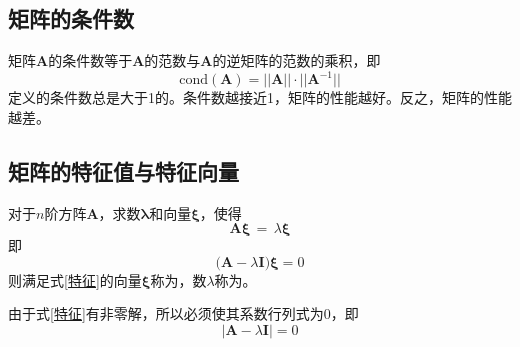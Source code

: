 \subsection{矩阵的条件数}
矩阵$\bm{A}$的条件数等于$\bm{A}$的范数与$\bm{A}$的逆矩阵的范数的乘积，即
\begin{equation}
	\text{cond}(\bm{A}) = \big|\big| \bm{A} \big|\big| \cdot \big|\big| \bm{A}^{-1} \big|\big|
\end{equation}
定义的条件数总是大于1的。条件数越接近1，矩阵的性能越好。反之，矩阵的性能越差。
\begin{table}[!htb]
	\centering
\end{table}

\subsection{矩阵的特征值与特征向量}
\tdefination[特征值与特征向量]
对于$n$阶方阵$\bm{A}$，求数$\bm{\lambda}$和向量$\bm{\xi}$，使得
\begin{equation}
	\bm{A}\bm{\xi} \,=\,\lambda \bm{\xi}
\end{equation}
即
\begin{equation}
	\big( \bm{A}-\lambda \bm{I} \big)\bm{\xi}=0
	\label{特征}
\end{equation}
则满足式\eqref{特征}的向量$\bm{\xi}$称为\dya[特征向量]，数$\lambda$称为\dya[特征值]。

由于式\eqref{特征}有非零解，所以必须使其系数行列式为0，即
\begin{equation}
	\big| \bm{A} - \lambda \bm{I} \big| = 0
\end{equation}

